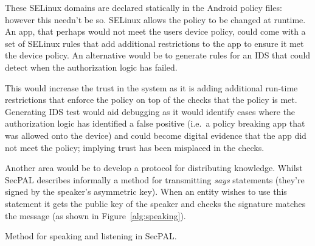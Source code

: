 \documentclass[a4paper]{article}
\begin{document}
These SELinux domains are declared statically in the Android policy files:
however this needn't be so.  SELinux allows the policy to be changed at runtime.
An app, that perhaps would not meet the users device policy, could come with a
set of SELinux rules that add additional restrictions to the app to ensure it
met the device policy.  An alternative would be to generate rules for an
\ac{IDS} that could detect when the authorization logic has failed.

This would increase the trust in the system as it is adding additional run-time
restrictions that enforce the policy on top of the checks that the policy is
met.  Generating \ac{IDS} test would aid debugging as it would identify cases
where the authorization logic has identified a false positive (i.e.~a policy
breaking app that was allowed onto the device) and could become digital evidence
that the app did not meet the policy; implying trust has been misplaced in the
checks.

Another area would be to develop a protocol for distributing knowledge.  
Whilst SecPAL describes informally a method for transmitting \emph{says}
statements (they're signed by the speaker's asymmetric key).  When an entity
wishes to use this statement it gets the public key of the speaker and checks
the signature matches the message (as shown in Figure~\ref{alg:speaking}).  

\begin{marginfigure}
  \begin{algorithm}[H]
    \;

  \end{algorithm}
  \caption{Method for speaking and listening in SecPAL.}
  \label{alg:speaking}
\end{marginfigure}
\end{document}
